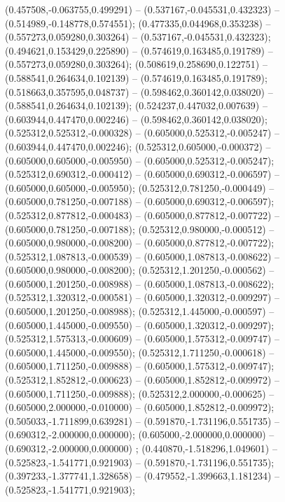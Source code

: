  (0.457508,-0.063755,0.499291) -- (0.537167,-0.045531,0.432323) -- (0.514989,-0.148778,0.574551);
 (0.477335,0.044968,0.353238) -- (0.557273,0.059280,0.303264) -- (0.537167,-0.045531,0.432323);
 (0.494621,0.153429,0.225890) -- (0.574619,0.163485,0.191789) -- (0.557273,0.059280,0.303264);
 (0.508619,0.258690,0.122751) -- (0.588541,0.264634,0.102139) -- (0.574619,0.163485,0.191789);
 (0.518663,0.357595,0.048737) -- (0.598462,0.360142,0.038020) -- (0.588541,0.264634,0.102139);
 (0.524237,0.447032,0.007639) -- (0.603944,0.447470,0.002246) -- (0.598462,0.360142,0.038020);
 (0.525312,0.525312,-0.000328) -- (0.605000,0.525312,-0.005247) -- (0.603944,0.447470,0.002246);
 (0.525312,0.605000,-0.000372) -- (0.605000,0.605000,-0.005950) -- (0.605000,0.525312,-0.005247);
 (0.525312,0.690312,-0.000412) -- (0.605000,0.690312,-0.006597) -- (0.605000,0.605000,-0.005950);
 (0.525312,0.781250,-0.000449) -- (0.605000,0.781250,-0.007188) -- (0.605000,0.690312,-0.006597);
 (0.525312,0.877812,-0.000483) -- (0.605000,0.877812,-0.007722) -- (0.605000,0.781250,-0.007188);
 (0.525312,0.980000,-0.000512) -- (0.605000,0.980000,-0.008200) -- (0.605000,0.877812,-0.007722);
 (0.525312,1.087813,-0.000539) -- (0.605000,1.087813,-0.008622) -- (0.605000,0.980000,-0.008200);
 (0.525312,1.201250,-0.000562) -- (0.605000,1.201250,-0.008988) -- (0.605000,1.087813,-0.008622);
 (0.525312,1.320312,-0.000581) -- (0.605000,1.320312,-0.009297) -- (0.605000,1.201250,-0.008988);
 (0.525312,1.445000,-0.000597) -- (0.605000,1.445000,-0.009550) -- (0.605000,1.320312,-0.009297);
 (0.525312,1.575313,-0.000609) -- (0.605000,1.575312,-0.009747) -- (0.605000,1.445000,-0.009550);
 (0.525312,1.711250,-0.000618) -- (0.605000,1.711250,-0.009888) -- (0.605000,1.575312,-0.009747);
 (0.525312,1.852812,-0.000623) -- (0.605000,1.852812,-0.009972) -- (0.605000,1.711250,-0.009888);
 (0.525312,2.000000,-0.000625) -- (0.605000,2.000000,-0.010000) -- (0.605000,1.852812,-0.009972);
 (0.505033,-1.711899,0.639281) -- (0.591870,-1.731196,0.551735) -- (0.690312,-2.000000,0.000000);
 (0.605000,-2.000000,0.000000) -- (0.690312,-2.000000,0.000000) ;
 (0.440870,-1.518296,1.049601) -- (0.525823,-1.541771,0.921903) -- (0.591870,-1.731196,0.551735);
 (0.397233,-1.377741,1.328658) -- (0.479552,-1.399663,1.181234) -- (0.525823,-1.541771,0.921903);
